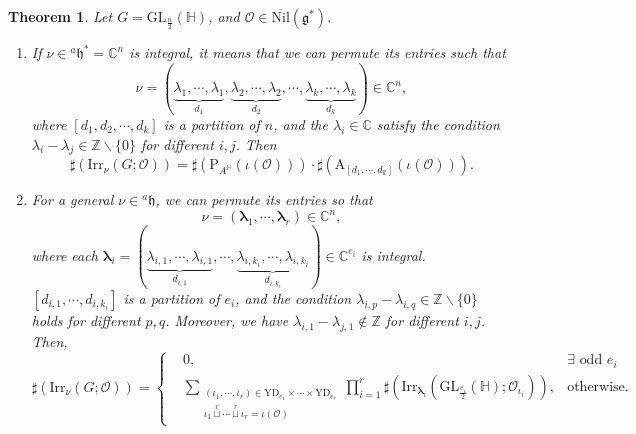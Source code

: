 \documentclass[12pt, a4paper]{amsart}
\numberwithin{equation}{section}
\newtheorem{thm}{Theorem}[section]
\newcommand{\blam}{{\boldsymbol{\lambda}}}
\newcommand{\BC}{{\mathbb {C}}}
\newcommand{\BH}{{\mathbb {H}}}
\newcommand{\BZ}{{\mathbb {Z}}}
\newcommand{\CO}{{\mathcal {O}}}
\newcommand{\fg}{\mathfrak{g}}
\newcommand{\fh}{\mathfrak{h}}
\newcommand{\GL}{{\mathrm{GL}}}
\newcommand{\A}{{\mathrm{A}}}
\newcommand{\Irr}{{\mathrm{Irr}}}
\newcommand{\Nil}{{\mathrm{Nil}}}
\renewcommand{\bar}{\overline}
\begin{document}
\begin{thm}\label{H}
    Let $G= \GL_{\frac{n}{2}}(\BH)$, and $\CO \in \bar{\Nil}(\fg^*)$.
    \begin{enumerate}
        \item If $\nu \in {^a\fh^*} = \BC^n$ is integral, it means that we can permute its entries such that 
        \[
        \nu =  (\underbrace{\lambda_1, \cdots, \lambda_1}_{d_1}, \underbrace{\lambda_2, \cdots, \lambda_2}_{d_2}, \cdots, \underbrace{\lambda_k, \cdots, \lambda_k}_{d_k} ) \in \BC^n,
        \]
        where $[d_1, d_2, \cdots, d_k]$ is a partition of $n$, and the $\lambda_i \in \BC$ satisfy the condition $\lambda_i - \lambda_j \in \BZ \backslash \{0\}$ for different $i,j$. Then
        \begin{equation}
            \sharp(\Irr_{\nu}(G;\CO)) = \sharp(\mathrm{P}_{A^{\BH}}(\iota(\CO)))\cdot \sharp(\A_{[d_1,\cdots,d_k]}(\iota(\CO))).
        \end{equation}
        \item For a general $\nu \in {^{a}\fh}$, we can permute its entries so that
        \[    
        \nu = (\blam_1, \cdots, \blam_r) \in \BC^n,
        \]
        where each $\blam_i = (\underbrace{\lambda_{i,1}, \cdots, \lambda_{i,1}}_{d_{i,1}},\cdots,\underbrace{\lambda_{i,k_i},\cdots,\lambda_{i,k_i}}_{d_{i,k_i}}) \in \BC^{e_i}$ is integral.\\ 
        $[d_{i,1}, \cdots, d_{i,k_i}]$ is a partition of $e_i$, and the condition $\lambda_{i,p} - \lambda_{i,q} \in \BZ \backslash \{0\}$ holds for different $p,q$. Moreover, we have $\lambda_{i,1} - \lambda_{j,1} \notin \BZ$ for different $i,j$. Then,
        \begin{equation}
            \sharp(\Irr_{\nu}(G;\CO)) = \left\{
            \begin{aligned}
                &0 , & \textrm{$\exists$ odd $e_i$}\\
                &\sum_{\substack{(\iota_1,\cdots,\iota_r) \in \mathrm{YD}_{e_1} \times \cdots \times \mathrm{YD}_{e_r} \\ \iota_1 \mathop{\sqcup}\limits^r \cdots  \mathop{\sqcup}\limits^r \iota_r = \iota(\CO)}} \prod_{i=1}^r \sharp(\Irr_{\blam_i}(\GL_{\frac{e_i}{2}}(\BH);\CO_{\iota_i})), & \textrm{otherwise}.
            \end{aligned}
            \right.
        \end{equation}
    \end{enumerate}
\end{thm}
\end{document}
